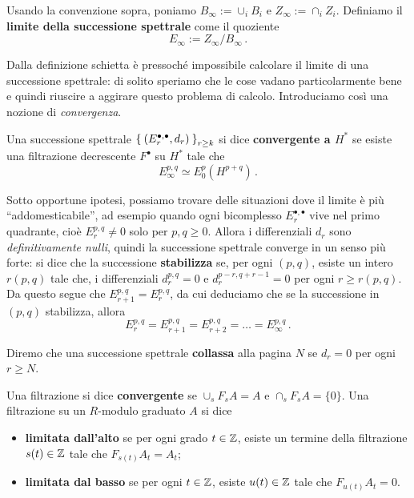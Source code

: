 \begin{df}
	Usando la convenzione sopra,
	poniamo $B_{\infty} := \cup_{i} B_{i}$ e $Z_{\infty} := \cap_{i} Z_{i}$.
	Definiamo il \textbf{limite della successione spettrale} come il quoziente
	$$E_{\infty} := Z_{\infty}/B_{\infty}\,.$$
\end{df}

Dalla definizione schietta è pressoché impossibile
calcolare il limite di una successione spettrale:
di solito speriamo che le cose vadano particolarmente bene
e quindi riuscire a aggirare questo problema di calcolo.
Introduciamo così una nozione di \emph{convergenza}.

\begin{df}
	Una successione spettrale $\Set{(E_{r}^{\bullet,\bullet},d_{r})}_{r \ge k}$
	si dice \textbf{convergente a $H^{*}$} se esiste 
	una filtrazione decrescente $F^{\bullet}$ su $H^{*}$ tale che
	\begin{equation*}
		E_{\infty}^{p,q} \simeq E_{0}^{p}(H^{p+q})\,.
	\end{equation*}
\end{df}

Sotto opportune ipotesi,
possiamo trovare delle situazioni dove il limite è più ``addomesticabile'',
ad esempio quando ogni bicomplesso $E^{\bullet,\bullet}_{r}$ vive nel primo quadrante,
cioè $E^{p,q}_{r} \ne 0$ solo per $p,q \ge 0$.
Allora i differenziali $d_{r}$ sono \emph{definitivamente nulli},
quindi la successione spettrale converge in un senso più forte:
si dice che la successione \textbf{stabilizza} se, per ogni $(p,q)$,
esiste un intero $r(p,q)$ tale che,
i differenziali $d_{r}^{p,q}=0$ e $d^{p-r,q+r-1}_{r}=0$ per ogni $r \ge r(p,q)$.
Da questo segue che $E_{r+1}^{p,q}=E_{r}^{p,q}$, da cui deduciamo che
se la successione in $(p,q)$ stabilizza, allora
\begin{equation*}
	E^{p,q}_{r} = E^{p,q}_{r+1} = E^{p,q}_{r+2} = \dots = E^{p,q}_{\infty}\,.
\end{equation*}

\begin{df}
	Diremo che una successione spettrale \textbf{collassa} alla pagina $N$
	se $d_{r}=0$ per ogni $r \ge N$.
\end{df}

\begin{df}
	Una filtrazione si dice \textbf{convergente} se $\cup_{s} F_{s}A = A$
	e $\cap_{s} F_{s}A = \{0\}$.
	Una filtrazione su un $R$-modulo graduato $A$ si dice 
	\begin{itemize}
		\item  \textbf{limitata dall'alto} se per ogni grado $t \in {\mathbb Z}$, 
		esiste un termine della filtrazione $s(t) \in {\mathbb Z}$ tale che $F_{s(t)}A_{t}=A_{t}$;
		\item  \textbf{limitata dal basso} se per ogni $t \in {\mathbb Z}$, esiste $u(t) \in {\mathbb Z}$
		tale che $F_{u(t)}A_{t} = 0$.
	\end{itemize}
\end{df}

